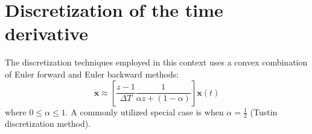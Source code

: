 \section{Discretization of the time derivative}

The discretization techniques employed in this context uses a convex combination of Euler forward and Euler backward methods:
\[\dot{\mathbf{x}}\approx \left[\dfrac{z-1}{\Delta T}\dfrac{1}{\alpha z + (1-\alpha)}\right]\mathbf{x}(t)\]
where $0 \leq\alpha\leq 1$. 
A commonly utilized special case is when $\alpha=\frac{1}{2}$ (Tustin discretization method).